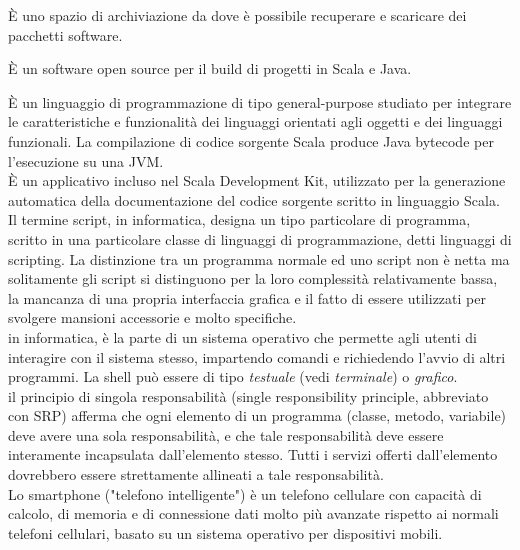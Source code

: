 \documentclass{scalatekids-article}
\begin{document}
   È uno spazio di archiviazione da dove è possibile recuperare e scaricare dei pacchetti software.
  \\


   È un software open source per il build di progetti in Scala e Java.

   È un linguaggio di programmazione di tipo general-purpose studiato per integrare le caratteristiche e funzionalità dei linguaggi orientati agli oggetti e dei linguaggi funzionali. La compilazione di codice sorgente Scala produce Java bytecode per l'esecuzione su una JVM.
  \\

   È un applicativo incluso nel Scala Development Kit, utilizzato per la generazione automatica della documentazione del codice sorgente scritto in linguaggio Scala.
  \\

   Il termine script, in informatica, designa un tipo particolare di programma, scritto in una particolare classe di linguaggi di programmazione, detti linguaggi di scripting.
  La distinzione tra un programma normale ed uno script non è netta ma solitamente gli script si distinguono per la loro complessità relativamente bassa, la mancanza di una propria interfaccia grafica e il fatto di essere utilizzati per svolgere mansioni accessorie e molto specifiche.
  \\

   in informatica, è la parte di un sistema operativo che permette agli utenti di interagire con il sistema stesso, impartendo comandi e richiedendo l'avvio di altri programmi.
  La shell può essere di tipo \textit{testuale} (vedi \textit{terminale}) o \textit{grafico}.
  \\

   il principio di singola responsabilità (single responsibility principle, abbreviato con SRP) afferma che ogni elemento di un programma (classe, metodo, variabile) deve avere una sola responsabilità, e che tale responsabilità deve essere interamente incapsulata dall'elemento stesso. Tutti i servizi offerti dall'elemento dovrebbero essere strettamente allineati a tale responsabilità.
  \\

   Lo smartphone ("telefono intelligente") è un telefono cellulare con capacità di calcolo, di memoria e di connessione dati molto più avanzate rispetto ai normali telefoni cellulari, basato su un sistema operativo per dispositivi mobili.
\end{document}
